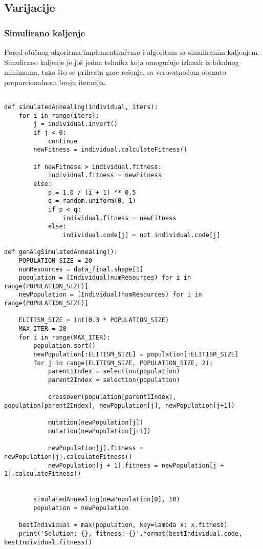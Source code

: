 \documentclass[11pt]{article} %
\begin{document}
\subsection{Varijacije}
\subsubsection{Simulirano kaljenje}

Pored običnog algoritma implementiraćemo i algoritam sa simuliranim kaljenjem. Simulirano kaljenje je još jedna tehnika koja omogućuje izlazak iz lokalnog minimuma, tako što se prihvata gore rešenje, sa verovatnoćom obrnuto-proporcionalnom broju iteracija.

\begin{lstlisting}
    
def simulatedAnnealing(individual, iters):
    for i in range(iters):
        j = individual.invert()
        if j < 0:
            continue
        newFitness = individual.calculateFitness()
        
        if newFitness > individual.fitness:
            individual.fitness = newFitness
        else:
            p = 1.0 / (i + 1) ** 0.5
            q = random.uniform(0, 1)
            if p < q:
                individual.fitness = newFitness
            else:
                individual.code[j] = not individual.code[j]
                
def genAlgSimulatedAnnealing():
    POPULATION_SIZE = 20
    numResources = data_final.shape[1]
    population = [Individual(numResources) for i in range(POPULATION_SIZE)]
    newPopulation = [Individual(numResources) for i in range(POPULATION_SIZE)]

    ELITISM_SIZE = int(0.3 * POPULATION_SIZE)
    MAX_ITER = 30
    for i in range(MAX_ITER):
        population.sort()
        newPopulation[:ELITISM_SIZE] = population[:ELITISM_SIZE]
        for j in range(ELITISM_SIZE, POPULATION_SIZE, 2):
            parent1Index = selection(population)
            parent2Index = selection(population)

            crossover(population[parent1Index], population[parent2Index], newPopulation[j], newPopulation[j+1])

            mutation(newPopulation[j])
            mutation(newPopulation[j+1])

            newPopulation[j].fitness = newPopulation[j].calculateFitness()
            newPopulation[j + 1].fitness = newPopulation[j + 1].calculateFitness()


        simulatedAnnealing(newPopulation[0], 10)
        population = newPopulation

    bestIndividual = max(population, key=lambda x: x.fitness)
    print('Solution: {}, fitness: {}'.format(bestIndividual.code, bestIndividual.fitness))
\end{lstlisting}
\end{document}
